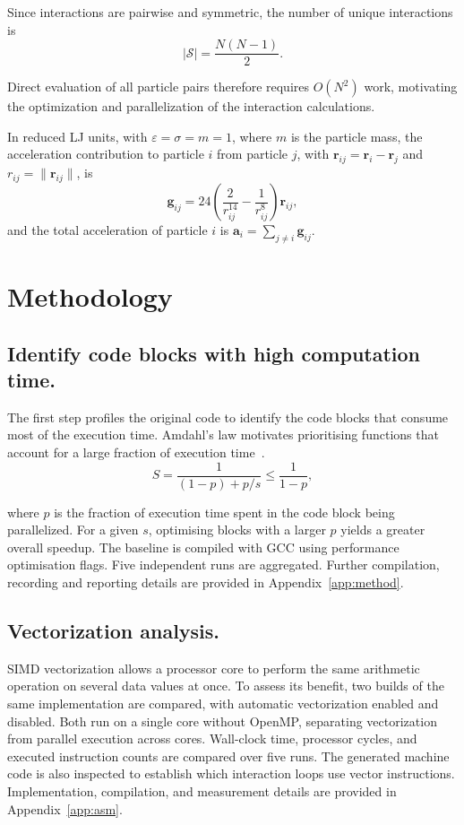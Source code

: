 \documentclass[conference]{IEEEtran}
\begin{document}
Since interactions are pairwise and symmetric, the number of
unique interactions is
\begin{equation}
 |\mathcal S|=\frac{N(N-1)}{2}.
 \label{eq:lj-pair-count}
\end{equation}

Direct evaluation of all particle pairs therefore requires $O(N^2)$
work, motivating the optimization and parallelization of the interaction
calculations.

In reduced LJ units, with $\varepsilon=\sigma=m=1$, where $m$ is the
particle mass, the acceleration contribution to particle
$i$ from particle $j$, with $\mathbf r_{ij}=\mathbf r_i-\mathbf r_j$
and $r_{ij}=\|\mathbf r_{ij}\|$, is
\begin{equation}
 \boxed{
 \mathbf g_{ij}
 =
 24\left(
 \frac{2}{r_{ij}^{14}}
 -
 \frac{1}{r_{ij}^{8}}
 \right)\mathbf r_{ij},
 }
 \label{eq:lj-reduced-acceleration}
\end{equation}
and the total acceleration of particle $i$ is
$\mathbf a_i=\sum_{j\neq i}\mathbf g_{ij}$.

\section{Methodology}
\label{sec:methodology}


\subsection{Identify code blocks with high computation time.}The first step profiles
the original code to identify the code blocks that consume most
of the execution time. Amdahl's law motivates prioritising functions
that account for a large fraction of execution time~\cite{amdahl1967}.
\begin{equation}
 S=\frac{1}{(1-p)+p/s}\le\frac{1}{1-p},
 \label{eq:amdahl}
\end{equation}

where $p$ is the fraction of execution time spent in the code block being parallelized. 
For a given $s$, optimising blocks with a larger $p$ yields a greater
overall speedup. The baseline is compiled with GCC using performance optimisation flags.
Five independent runs are aggregated. Further compilation, recording and reporting details
are provided in Appendix~\ref{app:method}.



\subsection{Vectorization analysis.}
\label{sec:vec-method}
SIMD vectorization allows a processor core to perform the same arithmetic
operation on several data values at once. To assess its benefit, two
builds of the same implementation are compared, with automatic
vectorization enabled and disabled. Both run on a single core without
OpenMP, separating vectorization from parallel execution across cores.
Wall-clock time, processor cycles, and executed instruction counts are
compared over five runs. The generated machine code is also inspected
to establish which interaction loops use vector instructions.
Implementation, compilation, and measurement details are provided in
Appendix~\ref{app:asm}.
\end{document}
